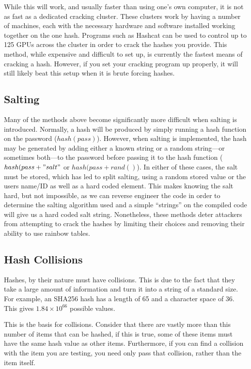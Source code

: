 			While this will work, and usually faster than using one's own computer, it is not as fast as a dedicated cracking cluster.
			These clusters work by having a number of machines, each with the necessary hardware and software installed working together on the one hash.
			Programs such as Hashcat can be used to control up to 125 GPUs across the cluster in order to crack the hashes you provide.
			This method, while expensive and difficult to set up, is currently the fastest means of cracking a hash.
			However, if you set your cracking program up properly, it will still likely beat this setup when it is brute forcing hashes.
		\subsection{Salting}
			Many of the methods above become significantly more difficult when salting is introduced.
			Normally, a hash will be produced by simply running a hash function on the password ($hash(pass)$).
			However, when salting is implemented, the hash may be generated by adding either a known string or a random string---or sometimes both---to the password before passing it to the hash function ($hash(pass + "salt"$ or $hash(pass + rand()$).
			In either of these cases, the salt must be stored, which has led to split salting, using a random stored value or the users name/ID as well as a hard coded element.
			This makes knowing the salt hard, but not impossible, as we can reverse engineer the code in order to determine the salting algorithm used and a simple ``strings'' on the compiled code will give us a hard coded salt string.
			Nonetheless, these methods deter attackers from attempting to crack the hashes by limiting their choices and removing their ability to use rainbow tables.
		\subsection{Hash Collisions}
			Hashes, by their nature must have collisions.
			This is due to the fact that they take a large amount of information and turn it into a string of a standard size.
			For example, an SHA256 hash has a length of 65 and a character space of 36.
			This gives $1.84\times10^{66}$ possible values.

			This is the basis for collisions.
			Consider that there are vastly more than this number of items that can be hashed,
			if this is true, some of these items must have the same hash value as other items.
			Furthermore, if you can find a collision with the item you are testing, you need only pass that collision, rather than the item itself.

